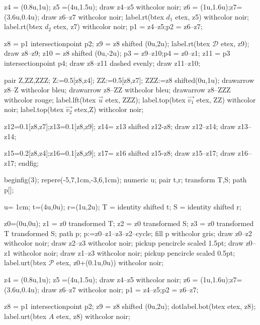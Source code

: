 \documentclass[12pt]{article}
\newcommand{\PR}{\mathscr{P}}
\begin{document}
 z4 = (0.8u,1u); z5 =(4u,1.5u);
 draw z4--z5 withcolor noir; 
 z6 = (1u,1.6u);z7=(3.6u,0.4u);
 draw z6--z7 withcolor noir; 
 label.rt(btex $d_1$ etex, z5) withcolor noir;
 label.rt(btex $d_2$ etex, z7) withcolor noir;
 p1 = z4--z5;p2 = z6--z7;

 z8 = p1 intersectionpoint p2;
 z9 = z8 shifted (0u,2u);
 label.rt(btex $\mathscr{D}$ etex, z9);
 draw z8--z9;
z10 = z8 shifted (0u,-2u);
p3 = z9--z10;p4 = z0--z1;
z11 = p3 intersectionpoint p4;
draw z8--z11 dashed evenly;
draw z11--z10;

pair Z,ZZ,ZZZ;
Z:=0.5[z8,z4];
ZZ:=0.5[z8,z7];
ZZZ:=z8 shifted(0u,1u);
drawarrow z8--Z withcolor bleu;
 drawarrow z8--ZZ withcolor bleu;
 drawarrow z8--ZZZ withcolor rouge;
 label.lft(btex $\overrightarrow{u}$ etex, ZZZ);
 label.top(btex $\overrightarrow{v_1}$ etex, ZZ) withcolor noir;
 label.top(btex $\overrightarrow{v_2}$ etex,Z) withcolor noir;





 z12=0.1[z8,z7];z13=0.1[z8,z9];
 z14= z13 shifted z12-z8;
 draw z12--z14;
 draw z13--z14;

 z15=0.2[z8,z4];z16=0.1[z8,z9];
 z17= z16 shifted z15-z8;
 draw z15--z17;
 draw z16--z17;
endfig;

beginfig(3);
 repere(-5,7,1cm,-3,6,1cm); 
 numeric u;
 pair t,r;
 transform T,S;
 path p[];

 u= 1cm;
 t=(4u,0u); r=(1u,2u);
 T = identity shifted t;
 S = identity shifted r;

 z0=(0u,0u);
 z1 = z0 transformed T;
 z2 = z0 transformed S;
 z3 = z0 transformed T transformed S;
 path p;
 p:=z0--z1--z3--z2--cycle;
 fill p withcolor gris;
 draw z0--z2 withcolor noir;
 draw z2--z3 withcolor noir;
 pickup pencircle scaled 1.5pt;
 draw z0--z1 withcolor noir;
 draw z1--z3 withcolor noir;
 pickup pencircle scaled 0.5pt;
 label.urt(btex $\PR$ etex, z0+(0.1u,0u)) withcolor noir;

 z4 = (0.8u,1u); z5 =(4u,1.5u);
 draw z4--z5 withcolor noir; 
 z6 = (1u,1.6u);z7=(3.6u,0.4u);
 draw z6--z7 withcolor noir; 
p1 = z4--z5;p2 = z6--z7;

z8 = p1 intersectionpoint p2;
z9 = z8 shifted (0u,2u);
dotlabel.bot(btex  etex, z8);
label.urt(btex $A$ etex, z8) withcolor noir;
\end{document}
